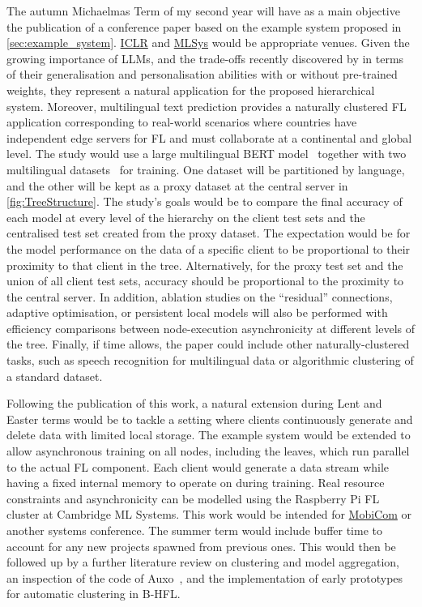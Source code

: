 The autumn Michaelmas Term of my second year will have as a main objective the publication of a conference paper based on the example system proposed in \cref{sec:example_system}. \href{https://iclr.cc/}{ICLR} and \href{https://mlsys.org/}{MLSys} would be appropriate venues. Given the growing importance of LLMs, and the trade-offs recently discovered by \citet{PersonalisationGeneralisationTradeoff} in terms of their generalisation and personalisation abilities with or without pre-trained weights, they represent a natural application for the proposed hierarchical system. Moreover, multilingual text prediction provides a naturally clustered FL application corresponding to real-world scenarios where countries have independent edge servers for FL and must collaborate at a continental and global level. The study would use a large multilingual BERT model~\citep{RoBERTA} together with two multilingual datasets~\citep[e.g., ][]{XGLUE,mC4} for training. One dataset will be partitioned by language, and the other will be kept as a proxy dataset at the central server in \cref{fig:TreeStructure}. The study's goals would be to compare the final accuracy of each model at every level of the hierarchy on the client test sets and the centralised test set created from the proxy dataset. The expectation would be for the model performance on the data of a specific client to be proportional to their proximity to that client in the tree. Alternatively, for the proxy test set and the union of all client test sets, accuracy should be proportional to the proximity to the central server. In addition, ablation studies on the ``residual'' connections, adaptive optimisation, or persistent local models will also be performed with efficiency comparisons between node-execution asynchronicity at different levels of the tree. Finally, if time allows, the paper could include other naturally-clustered tasks, such as speech recognition for multilingual data or algorithmic clustering of a standard dataset.

Following the publication of this work, a natural extension during Lent and Easter terms would be to tackle a setting where clients continuously generate and delete data with limited local storage. The example system would be extended to allow asynchronous training on all nodes, including the leaves, which run parallel to the actual FL component. Each client would generate a data stream while having a fixed internal memory to operate on during training. Real resource constraints and asynchronicity can be modelled using the Raspberry Pi FL cluster at Cambridge ML Systems. This work would be intended for \href{https://sigmobile.org/mobicom/2023/}{MobiCom} or another systems conference. The summer term would include buffer time to account for any new projects spawned from previous ones. This would then be followed up by a further literature review on clustering and model aggregation, an inspection of the code of Auxo~\citep{Auxo}, and the implementation of early prototypes for automatic clustering in B-HFL\@.
